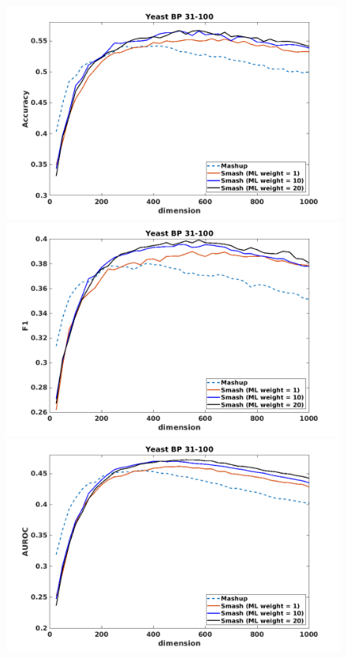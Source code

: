 \documentclass[12pt]{amsart}
\theoremstyle{remark}
\theoremstyle{definition}
\numberwithin{equation}{section} \numberwithin{table}{section}
\numberwithin{figure}{section}
\numberwithin{algorithm}{section}
\numberwithin{theorem}{section}
\begin{document}
\begin{figure}[h!]
	\centering
	\includegraphics[width=.8\linewidth]{Yeast-BP-31-100-Acc}  \\
	\includegraphics[width=.8\linewidth]{Yeast-BP-31-100-F1}  \\
	\includegraphics[width=.8\linewidth]{Yeast-BP-31-100-AUROC} 
\end{figure}
\end{document}
